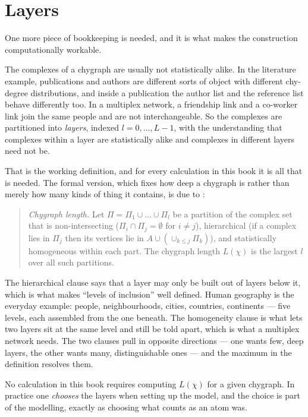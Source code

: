 \section{Layers}
\label{sec:layers}

One more piece of bookkeeping is needed, and it is what makes the construction
computationally workable.

The complexes of a chygraph are usually not statistically alike. In the
literature example, publications and authors are different sorts of object with
different chy-degree distributions, and inside a publication the author list and
the reference list behave differently too. In a multiplex network, a friendship
link and a co-worker link join the same people and are not interchangeable. So
the complexes are partitioned into \emph{layers}, indexed $l=0,\dots,L-1$, with the
understanding that complexes within a layer are statistically alike and
complexes in different layers need not be.

That is the working definition, and for every calculation in this book it is
all that is needed. The formal version, which fixes how deep a chygraph is
rather than merely how many kinds of thing it contains, is due to
\citet{vazquez2023pre}:

\begin{quote}
\emph{Chygraph length.} Let $\Pi=\Pi_1\cup\dots\cup\Pi_l$ be a partition of the
complex set that is non-intersecting ($\Pi_i\cap\Pi_j=\emptyset$ for $i\ne j$),
hierarchical (if a complex lies in $\Pi_j$ then its vertices lie in
$A\cup(\cup_{k\le j}\Pi_k)$), and statistically homogeneous within each part.
The chygraph length $L(\chi)$ is the largest $l$ over all such partitions.
\end{quote}

The hierarchical clause says that a layer may only be built out of layers below
it, which is what makes ``levels of inclusion'' well defined. Human geography is
the everyday example: people, neighbourhoods, cities, countries, continents ---
five levels, each assembled from the one beneath. The homogeneity clause is what
lets two layers sit at the same level and still be told apart, which is what a
multiplex network needs. The two clauses pull in opposite directions --- one
wants few, deep layers, the other wants many, distinguishable ones --- and the
maximum in the definition resolves them.

No calculation in this book requires computing $L(\chi)$ for a given chygraph. In practice one \emph{chooses} the layers when
setting up the model, and the choice is part of the modelling, exactly as
choosing what counts as an atom was.

